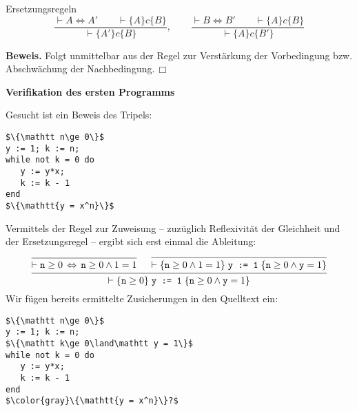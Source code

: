 \documentclass[8pt,fleqn,aspectratio=169]{beamer}
\newcommand{\strong}[1]{\textsf{\textbf{#1}}}
\renewcommand{\qedsymbol}{\ensuremath{\Box}}
\newcommand{\centerheadline}[1]{%
  \begin{center}\strong{#1}\end{center}}
\newcommand{\code}[1]{{\texttt{#1}}}
\begin{document}
\begin{frame}
\begin{block}{Ersetzungsregeln}
\[\dfrac{\vdash A\Leftrightarrow A'\qquad\vdash\{A\}c\{B\}}{
  \vdash\{A'\}c\{B\}},\qquad
\dfrac{\vdash B\Leftrightarrow B'\qquad\vdash\{A\}c\{B\}}{
  \vdash\{A\}c\{B'\}}\]
\end{block}\pause
\strong{Beweis.} Folgt unmittelbar aus der Regel zur Verstärkung der
Vorbedingung bzw. Abschwächung der Nachbedingung.\,\qedsymbol
\end{frame}

\begin{frame}
\centerheadline{Verifikation des ersten Programms}
\end{frame}

\begin{frame}[fragile]
Gesucht ist ein Beweis des Tripels:
\begin{lstlisting}[language=IMP, xleftmargin=\mathindent, mathescape]
$\{\mathtt n\ge 0\}$
y := 1; k := n;
while not k = 0 do
   y := y*x;
   k := k - 1
end
$\{\mathtt{y = x^n}\}$
\end{lstlisting}
\end{frame}

\begin{frame}[fragile]
Vermittels der Regel zur Zuweisung -- zuzüglich Reflexivität der
Gleichheit und der Ersetzungsregel -- ergibt sich erst einmal die Ableitung:
\[\begin{prooftree}
  \infer0{\vdash \mathtt n\ge 0\,\Leftrightarrow\,\mathtt n\ge 0\land 1 = 1}
  \infer0{\vdash\{\mathtt n\ge 0\land 1 = 1\}\;\code{y := 1}\;\{\mathtt n\ge 0\land\mathtt y = 1\}}
\infer2{\vdash\{\mathtt n\ge 0\}\;\code{y := 1}\;\{\mathtt n\ge 0\land\mathtt y = 1\}}
\end{prooftree}\]\pause
Wir fügen bereits ermittelte Zusicherungen in den Quelltext ein:
\begin{lstlisting}[language=IMP, xleftmargin=\mathindent, mathescape]
$\{\mathtt n\ge 0\}$
y := 1; k := n;
$\{\mathtt k\ge 0\land\mathtt y = 1\}$
while not k = 0 do
   y := y*x;
   k := k - 1
end
$\color{gray}\{\mathtt{y = x^n}\}?$
\end{lstlisting}
\end{frame}
\end{document}
